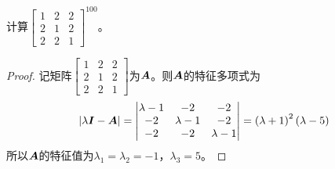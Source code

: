 \begin{problem}
计算\({\begin{bmatrix}1&2&2\\2&1&2\\2&2&1\end{bmatrix}}^{100}\)。
\end{problem}
\begin{proof}
    记矩阵\(\begin{bmatrix}1&2&2\\2&1&2\\2&2&1\end{bmatrix}\)为\(\boldsymbol{A}\)。则\(\boldsymbol{A}\)的特征多项式为
    \begin{equation*}
        \left|\lambda\boldsymbol{I}-\boldsymbol{A} \right|=\begin{vmatrix}\lambda-1&-2&-2\\-2&\lambda-1&-2\\-2&-2&\lambda-1\end{vmatrix}=\left( \lambda+1 \right)^2\left( \lambda-5 \right)
    \end{equation*}
    所以\(\boldsymbol{A}\)的特征值为\(\lambda_1=\lambda_2=-1\)，\(\lambda_3=5\)。


\end{proof}
